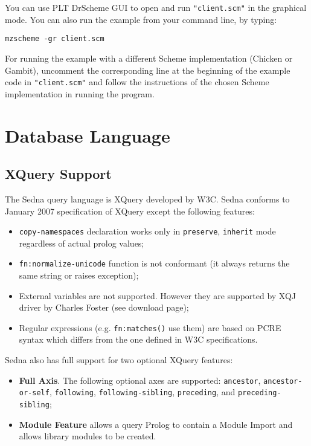 \documentclass[a4paper,12pt]{article}
\begin{document}
You can use PLT DrScheme GUI to open and run \texttt{"client.scm"} in the
graphical mode. You can also run the example from your command line, by typing:

\begin{verbatim}
mzscheme -gr client.scm
\end{verbatim}

For running the example with a different Scheme implementation (Chicken or
Gambit), uncomment the corresponding line at the beginning of the example code
in \texttt{"client.scm"} and follow the instructions of the chosen Scheme
implementation in running the program.


\section{Database Language}
\label{sec:DBLang}

\subsection{XQuery Support}
\label{sec:xquery-support}
The Sedna query language is XQuery \cite{paper:query-language} developed by W3C.
Sedna conforms to January 2007 specification of XQuery except the following
features:

\begin{itemize}
\item \verb!copy-namespaces! declaration works only in \verb!preserve!,
\verb!inherit! mode regardless of actual prolog values;
\item \verb!fn:normalize-unicode! function is not conformant (it always returns
the same string or raises exception);
\item External variables are not supported. However they are supported by XQJ
driver by Charles Foster (see download page);
\item Regular expressions (e.g. \verb!fn:matches()! use them) are based on
PCRE~\cite{lib:pcre-lib} syntax which differs from the one defined in W3C
specifications.
\end{itemize}

Sedna also has full support for two optional XQuery features:
\begin{itemize}
\item\textbf{Full Axis}. The following optional axes are supported:
\verb!ancestor!, \verb!ancestor-or-self!, \verb!following!,
\verb!following-sibling!, \verb!preceding!, and \verb!preceding-sibling!;
\item\textbf{Module Feature} allows a query Prolog to contain a Module Import
and allows library modules to be created.
\end{itemize}
\end{document}
